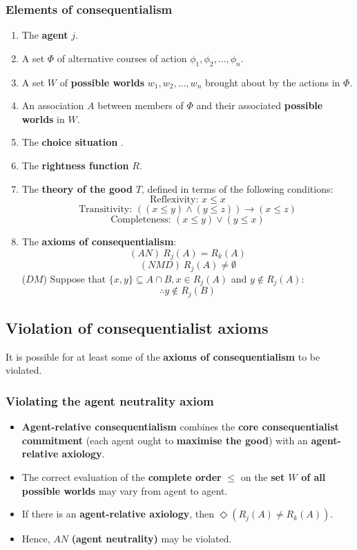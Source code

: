 \documentclass[11pt]{article}
\begin{document}
 \newpage
\subsubsection{Elements of consequentialism}
\label{sec:org3ed2ac0}
\begin{enumerate}
\item The \textbf{agent} \(j\).
\item A set \(\Phi\) of alternative courses of action \(\phi_1, \phi_2, \ldots, \phi_n\).
\item A set \(W\) of \textbf{possible worlds} \(w_1, w_2, \ldots, w_n\) brought about by the actions in \(\Phi\).
\item An association \(A\) between members of \(\Phi\) and their associated \textbf{possible worlds} in \(W\).
\item The \textbf{choice situation} \(<j, A>\).
\item The \textbf{rightness function} \(R\).
\item The \textbf{theory of the good} \(T\), defined in terms of the following conditions:
\[\text{Reflexivity: } x \le x\]
\[\text{Transitivity: } ((x \le y) \wedge (y \le z)) \rightarrow (x \le z)\]
\[\text{Completeness: } (x \le y) \vee (y \le x)\]
\item The \textbf{axioms of consequentialism}:
\[(AN) \ R_j(A) = R_k (A)\]
\[(NMD) \ R_j(A) \ne \emptyset\]
(\(DM\)) Suppose that \(\{x, y\} \subseteq A \cap B, x \in R_j (A)\) and \(y \notin R_j (A)\):
\[\therefore y \notin R_j (B)\]
\end{enumerate}

 \newpage
\subsection{Violation of consequentialist axioms}
\label{sec:org503cb10}
It is possible for at least some of the \textbf{axioms of consequentialism} to be violated.
\subsubsection{Violating the agent neutrality axiom}
\label{sec:org6baaa9a}
\begin{itemize}
\item \textbf{Agent-relative consequentialism} combines the \textbf{core consequentialist commitment} (each agent ought to \textbf{maximise the good}) with an \textbf{agent-relative axiology}.
\item The correct evaluation of the \textbf{complete order} \(\le\) on the \textbf{set \(W\) of all possible worlds} may vary from agent to agent.
\item If there is an \textbf{agent-relative axiology}, then \(\Diamond (R_j (A) \ne R_k (A))\).
\item Hence, \(AN\) \textbf{(agent neutrality)} may be violated.
\end{itemize}
\end{document}
